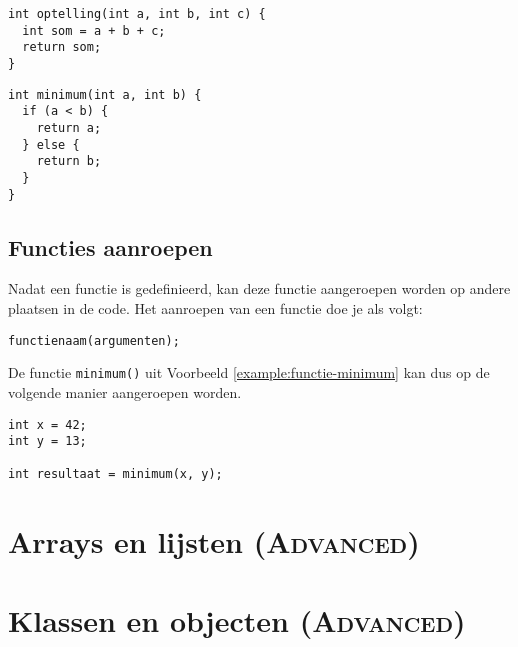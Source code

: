 \documentclass[11pt,fleqn]{book} %
\begin{document}
\begin{example}
	\phantom{ }
	\begin{verbatim}
int optelling(int a, int b, int c) {
  int som = a + b + c;
  return som;
}
	\end{verbatim}
\end{example}

\begin{example}
	\label{example:functie-minimum}
	\phantom{ }
	\begin{verbatim}
int minimum(int a, int b) {
  if (a < b) {
    return a;
  } else {
    return b;
  }
}
	\end{verbatim}
\end{example}

\section{Functies aanroepen}
Nadat een functie is gedefinieerd, kan deze functie aangeroepen worden op andere plaatsen in de code. Het aanroepen van een functie doe je als volgt:

\begin{center}
	\texttt{functienaam(argumenten);}
\end{center}
\noindent
De functie \texttt{minimum()} uit Voorbeeld \ref{example:functie-minimum} kan dus op de volgende manier aangeroepen worden. 

\begin{example}
	\phantom{ }
	\begin{verbatim}
int x = 42;
int y = 13;

int resultaat = minimum(x, y);
	\end{verbatim}
\end{example}


\chapter{Arrays en lijsten \textsc{\footnotesize(Advanced)}}
\chapter{Klassen en objecten \textsc{\footnotesize(Advanced)}}
\end{document}
